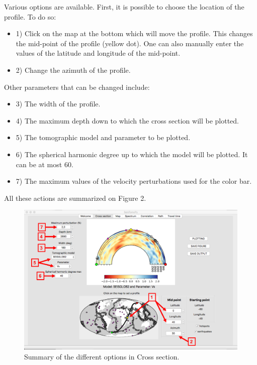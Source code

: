 \documentclass[12pt]{article}
\begin{document}
Various options are available.  First, it is possible to choose the
location of the profile. To do so: 
\begin{itemize}
\item 1) Click on the map at the bottom
which will move the profile. This changes the mid-point of the
profile (yellow dot). One can also manually enter the values of the
latitude and longitude of the mid-point.
\item 2) Change the azimuth of the profile.
\end{itemize}
Other parameters that can be changed include: 
\begin{itemize}
\item 3) The width of the profile.
\item 4) The maximum depth down to which the cross section will be plotted.
\item 5) The tomographic model and parameter to be plotted.
\item 6) The spherical harmonic degree up to which the model will be plotted. It can be at most 60.
\item 7) The maximum values of the velocity perturbations used for the color bar.

\end{itemize}
All these actions are summarized on Figure 2.

\begin{figure}
\begin{center}
\includegraphics[scale=0.47]{SeisTomoPy_notebook/figures/crosspy.png}
\caption{Summary of the different options in Cross section.}
\label{crosspy}
\end{center}
\end{figure}
\end{document}
